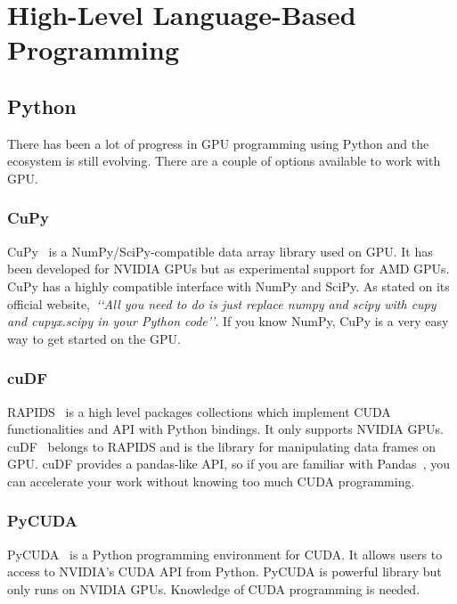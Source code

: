\section{High-Level Language-Based Programming}


\subsection{Python}


\par
There has been a lot of progress in GPU programming using Python and the ecosystem is still evolving.
There are a couple of options available to work with GPU.


\subsubsection{CuPy}


\par
CuPy~\cite{cupy} is a NumPy/SciPy-compatible data array library used on GPU.
It has been developed for NVIDIA GPUs but as experimental support for AMD GPUs.
CuPy has a highly compatible interface with NumPy and SciPy.
As stated on its official website,~\textit{\lq\lq All you need to do is just replace numpy and scipy with cupy and cupyx.scipy in your Python code\rq\rq}.
If you know NumPy, CuPy is a very easy way to get started on the GPU.


\subsubsection{cuDF}


\par
RAPIDS~\cite{rapids} is a high level packages collections which implement CUDA functionalities and API with Python bindings.
It only supports NVIDIA GPUs.
cuDF~\cite{cudf} belongs to RAPIDS and is the library for manipulating data frames on GPU.
cuDF provides a pandas-like API, so if you are familiar with Pandas~\cite{pandas}, you can accelerate your work without knowing too much CUDA programming.


\subsubsection{PyCUDA}


\par
PyCUDA~\cite{pycuda} is a Python programming environment for CUDA.
It allows users to access to NVIDIA’s CUDA API from Python.
PyCUDA is powerful library but only runs on NVIDIA GPUs.
Knowledge of CUDA programming is needed.


